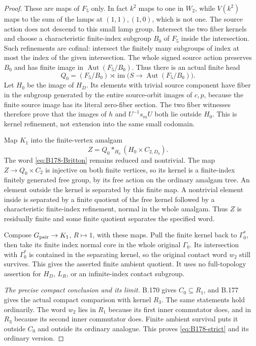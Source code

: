 \begin{proof}
These are maps of \(F_5\) only. In fact \(k^2\) maps to one in
\(W_2\), while \(V(k^2)\) maps to the sum of the lamps at
\((1,1),(1,0)\), which is not one. The source action does not descend
to this small lamp group. Intersect the two fiber kernels and choose
a characteristic finite-index subgroup \(B_0\) of \(F_5\) inside
the intersection. Such refinements are cofinal: intersect the finitely
many subgroups of index at most the index of the given intersection.
The whole signed source action preserves \(B_0\) and has finite image
in \(\operatorname{Aut}(F_5/B_0)\). Thus there is an actual finite head
\[
 Q_0=(F_5/B_0)\rtimes
                \operatorname{im}\bigl(S\to\operatorname{Aut}(F_5/B_0)\bigr).
\]
Let \(H_0\) be the image of \(H_D\). Its elements with trivial
source component have fiber in the subgroup generated by the entire
source-orbit images of \(c,p\), because the finite source image has
its literal zero-fiber section. The two fiber witnesses therefore prove
that the images of \(h\) and \(U^{-1}s_mU\) both lie outside \(H_0\).
This is kernel refinement, not extension into the same small codomain.

Map \(K_1\) into the finite-vertex amalgam
\[
                     Z=Q_0*_{H_0}(H_0\times C_{2,D_0}).
\]
The word \eqref{eq:B178-Britton} remains reduced and nontrivial.
The map \(Z\to Q_0\times C_2\) is injective on both finite vertices,
so its kernel is a finite-index finitely generated free group, by its
free action on the ordinary amalgam tree. An element outside the kernel
is separated by this finite map. A nontrivial element inside is separated
by a finite quotient of the free kernel followed by a characteristic
finite-index refinement, normal in the whole amalgam. Thus \(Z\) is
residually finite and some finite quotient separates the specified word.

Compose \(G_{\rm pair}\to K_1\), \(R\mapsto1\), with these maps.
Pull the finite kernel back to \(\Gamma _0^*\), then take its finite
index normal core in the whole original \(\Gamma _0\). Its intersection
with \(\Gamma _0^*\) is contained in the separating kernel, so the
original contact word \(w_2\) still survives. This gives the asserted
finite ambient quotient. It uses no full-topology assertion for \(H_D\),
\(L_R\), or an infinite-index contact subgroup.

\emph{The precise compact conclusion and its limit.}
B.170 gives \(C_0\subseteq R_1\), and B.177 gives the actual compact
comparison with kernel \(R_3\). The same statements hold ordinarily.
The word \(w_2\) lies in \(R_1\) because its first inner commutator
does, and in \(R_3\) because its second inner commutator does.
Finite ambient survival puts it outside \(C_0\) and outside its ordinary
analogue. This proves \eqref{eq:B178-strict} and its ordinary version.


\end{proof}

